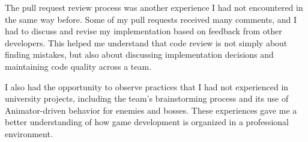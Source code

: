 The pull request review process was another experience I had not encountered in the same way before. Some of my pull requests received many comments, and I had to discuss and revise my implementation based on feedback from other developers. This helped me understand that code review is not simply about finding mistakes, but also about discussing implementation decisions and maintaining code quality across a team.

I also had the opportunity to observe practices that I had not experienced in university projects, including the team's brainstorming process and its use of Animator-driven behavior for enemies and bosses. These experiences gave me a better understanding of how game development is organized in a professional environment.